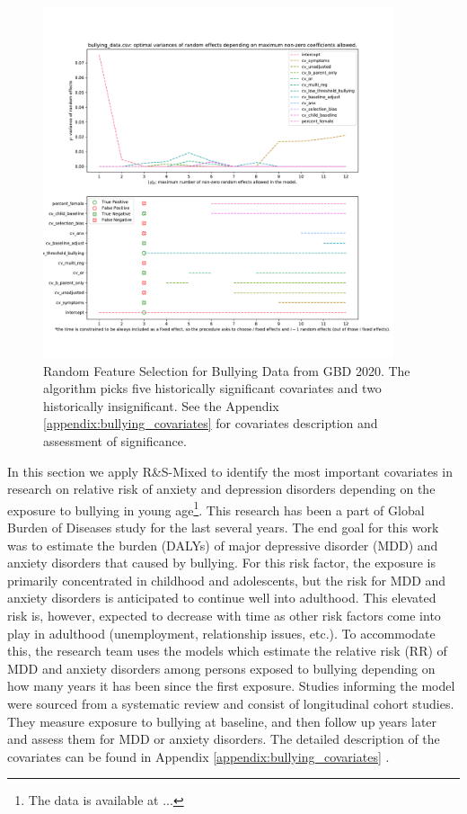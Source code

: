 \documentclass[11pt,letterpaper]{article}
\newcommand{\ouralgo}{R\&S-Mixed }
\numberwithin{equation}{section} %
\numberwithin{figure}{section} %
\numberwithin{table}{section} %
\begin{document}
\begin{figure}
	\caption{\label{fig:bullying_data_random_feature_selection}Random Feature Selection for Bullying Data from GBD 2020. The algorithm picks five historically significant covariates and two historically insignificant. See the Appendix \ref{appendix:bullying_covariates} for covariates description and assessment of significance.}
	\includegraphics[width=0.92\textwidth]{Images/bullying_data.csv_random_feature_selection}
\end{figure}

In this section we apply \ouralgo to identify the most important covariates in research on relative risk of anxiety and depression disorders depending on the exposure to bullying in young age\footnote{The data is available at ...}. This research has been a part of Global Burden of Diseases study for the last several years. The end goal for this work was to estimate the burden (DALYs) of major depressive disorder (MDD) and anxiety disorders that caused by bullying. For this risk factor, the exposure is primarily concentrated in childhood and adolescents, but the risk for MDD and anxiety disorders is anticipated to continue well into adulthood. This elevated risk is, however, expected to decrease with time as other risk factors come into play in adulthood (unemployment, relationship issues, etc.). To accommodate this, the research team uses the models which estimate the relative risk (RR) of MDD and anxiety disorders among persons exposed to bullying depending on how many years it has been since the first exposure. Studies informing the model were sourced from a systematic review and consist of longitudinal cohort studies. They measure exposure to bullying at baseline, and then follow up years later and assess them for MDD or anxiety disorders. The detailed description of the covariates can be found in Appendix \ref{appendix:bullying_covariates} .
\end{document}
